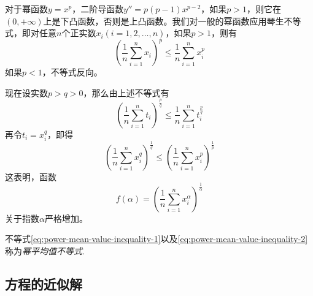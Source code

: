 \begin{example}[幂函数的凸性与幂平均值不等式]
  对于幂函数$y=x^p$，二阶导函数$y''=p(p-1)x^{p-2}$，如果$p>1$，则它在$(0,+\infty)$上是下凸函数，否则是上凸函数。我们对一般的幂函数应用琴生不等式，即对任意$n$个正实数$x_i(i=1,2,\ldots,n)$，如果$p>1$，则有
  \begin{equation}
    \label{eq:power-mean-value-inequality-1}
   \left( \frac{1}{n} \sum_{i=1}^n x_i \right)^p \leqslant \frac{1}{n}\sum_{i=1}^n x_i^p 
  \end{equation}
  如果$p<1$，不等式反向。

  现在设实数$p>q>0$，那么由上述不等式有
  \[ \left( \frac{1}{n} \sum_{i=1}^n t_i \right)^{\frac{p}{q}} \leqslant \frac{1}{n}\sum_{i=1}^n t_i^{\frac{p}{q}} \]
  再令$t_i=x_i^q$，即得
  \begin{equation}
    \label{eq:power-mean-value-inequality-2}
   \left( \frac{1}{n} \sum_{i=1}^n x_i^q \right)^{\frac{1}{q}} \leqslant  \left( \frac{1}{n} \sum_{i=1}^n x_i^p \right)^{\frac{1}{p}}
 \end{equation}
 这表明，函数
 \[ f(\alpha) = \left( \frac{1}{n} \sum_{i=1}^n x_i^{\alpha} \right)^{\frac{1}{\alpha}} \]
 关于指数$\alpha$严格增加。

 不等式\autoref{eq:power-mean-value-inequality-1}以及\autoref{eq:power-mean-value-inequality-2}称为\emph{幂平均值不等式}.
\end{example}


\subsection{方程的近似解}
\label{sec:approx-solve-of-equation}






